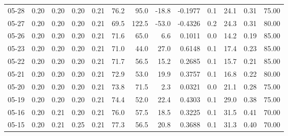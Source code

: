\begin{threeparttable}
{\begin{tabular}{lrrrrrrrrrrrr}
  05-28 &          0.20 &          0.20 &          0.20 &        0.21 &                76.2 &                95.0 &      -18.8 &      -0.1977 &                 0.1 &             24.1 &            0.31 &                  75.00 \\
  05-27 &          0.20 &          0.20 &          0.20 &        0.21 &                69.5 &               122.5 &      -53.0 &      -0.4326 &                 0.2 &             24.3 &            0.31 &                  80.00 \\
  05-26 &          0.20 &          0.20 &          0.20 &        0.21 &                71.6 &                65.0 &        6.6 &       0.1011 &                 0.0 &             14.2 &            0.19 &                  85.00 \\
  05-23 &          0.20 &          0.20 &          0.20 &        0.21 &                71.0 &                44.0 &       27.0 &       0.6148 &                 0.1 &             17.4 &            0.23 &                  85.00 \\
  05-22 &          0.20 &          0.20 &          0.20 &        0.21 &                71.7 &                56.5 &       15.2 &       0.2685 &                 0.1 &             15.7 &            0.21 &                  85.00 \\
  05-21 &          0.20 &          0.20 &          0.20 &        0.21 &                72.9 &                53.0 &       19.9 &       0.3757 &                 0.1 &             16.8 &            0.22 &                  80.00 \\
  05-20 &          0.20 &          0.20 &          0.20 &        0.21 &                73.8 &                71.5 &        2.3 &       0.0321 &                 0.0 &             21.1 &            0.28 &                  75.00 \\
  05-19 &          0.20 &          0.20 &          0.20 &        0.21 &                74.4 &                52.0 &       22.4 &       0.4303 &                 0.1 &             29.0 &            0.38 &                  75.00 \\
  05-16 &          0.20 &          0.21 &          0.20 &        0.21 &                76.0 &                57.5 &       18.5 &       0.3225 &                 0.1 &             31.5 &            0.41 &                  70.00 \\
  05-15 &          0.20 &          0.21 &          0.25 &        0.21 &                77.3 &                56.5 &       20.8 &       0.3688 &                 0.1 &             31.3 &            0.40 &                  70.00 \\

\end{tabular}}
\end{threeparttable}
